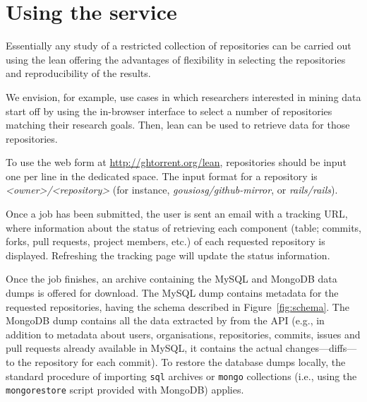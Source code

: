 
\section{Using the service}
\label{sec:usage}

Essentially any study of a restricted collection of \gh repositories can be carried out using the lean \ght offering the advantages of flexibility in selecting the repositories and reproducibility of the results.

We envision, for example, use cases in which researchers interested in mining \gh data start off by using the in-browser
interface to select a number of \gh repositories matching their research goals.
Then, lean \ght can be used to retrieve data for those repositories.

To use the web form at \url{http://ghtorrent.org/lean}, repositories should be input one per line in the dedicated space.
The input format for a repository is \emph{<owner>/<repository>} (for instance, \emph{gousiosg/github-mirror}, or \emph{rails/rails}).

Once a job has been submitted, the user is sent an email with a tracking URL, where information about the status of retrieving
each component (table; commits, forks, pull requests, project members, etc.) of each requested repository is displayed.
Refreshing the tracking page will update the status information.
%
%
%
%
%
%
%
%
%
%

Once the job finishes, an archive containing the MySQL and MongoDB data dumps is offered for download.
The MySQL dump contains metadata for the requested repositories, having the schema described in Figure~\ref{fig:schema}.
The MongoDB dump contains all the data extracted by \ght from the \gh API (e.g., in addition to metadata about users,
organisations, repositories, commits, issues and pull requests already available in MySQL, it contains the actual 
changes---diffs---to the repository for each commit).
%
To restore the database dumps locally, the standard procedure of importing \texttt{sql} archives or \texttt{mongo} collections
(i.e., using the \texttt{mongorestore} script provided with MongoDB) applies.



